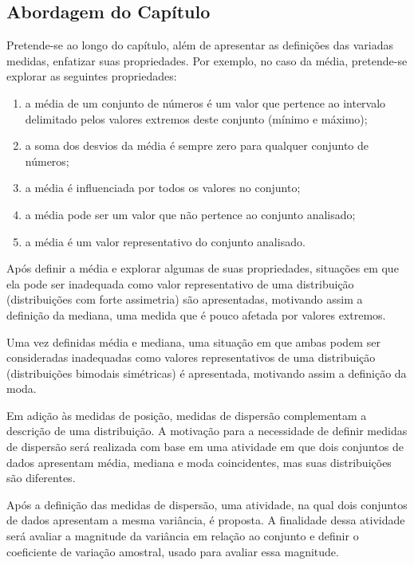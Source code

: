 \begin{apresentacao}
\section{Abordagem do Capítulo}

Pretende-se ao longo do capítulo, além de apresentar as definições das variadas medidas, enfatizar suas propriedades. Por exemplo, no caso da média, pretende-se explorar as seguintes propriedades:

\begin{enumerate}
\item a média de um conjunto de números é um valor que pertence ao intervalo delimitado pelos valores extremos deste conjunto (mínimo e máximo);
\item a soma dos desvios da média é sempre zero para qualquer conjunto de números;
\item a média é influenciada por todos os valores no conjunto;
\item a média pode ser um valor que não pertence ao conjunto analisado;
\item a média é um valor representativo do conjunto analisado.
\end{enumerate}

Após definir a média e explorar algumas de suas propriedades, situações em que ela pode ser inadequada como valor representativo de uma distribuição (distribuições com forte assimetria) são apresentadas, motivando assim a definição da mediana, uma medida que é pouco afetada por valores extremos.

Uma vez definidas média e mediana, uma situação em que ambas podem ser consideradas inadequadas como valores representativos de uma distribuição (distribuições bimodais simétricas) é apresentada, motivando assim a definição da moda.

Em adição às medidas de posição, medidas de dispersão complementam a descrição de uma distribuição. A motivação para a necessidade de definir medidas de dispersão será realizada com base em uma atividade em que dois conjuntos de dados apresentam média, mediana e moda coincidentes, mas suas distribuições são diferentes.

Após a definição das medidas de dispersão, uma atividade, na qual dois conjuntos de dados apresentam a mesma variância, é proposta. A finalidade dessa atividade será avaliar a magnitude da variância em relação ao conjunto e definir o coeficiente de variação amostral, usado para avaliar essa magnitude.


\end{apresentacao}
